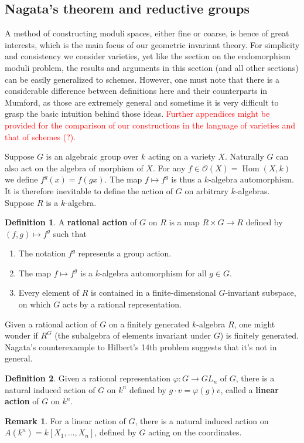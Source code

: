 \documentclass[12pt]{article}
\theoremstyle{remark}
\theoremstyle{definition}
\newtheorem{remark}{Remark}[section]
\newtheorem{definition}{Definition}[section]
\newcommand{\Hom}[0]{\operatorname{Hom}}
\begin{document}
    \subsection{Nagata's theorem and reductive groups}
    A method of constructing moduli spaces, either fine or coarse, is hence of great interests, which is the main focus of our geometric invariant theory. For simplicity and consistency we consider varieties, yet like the section on the endomorphism moduli problem, the results and arguments in this section (and all other sections) can be easily generalized to schemes. However, one must note that there is a considerable difference between definitions here and their counterparts in Mumford, as those are extremely general and sometime it is very difficult to grasp the basic intuition behind those ideas. \textcolor{red}{Further appendices might be provided for the comparison of our constructions in the language of varieties and that of schemes (?).}

    Suppose $G$ is an algebraic group over $k$ acting on a variety $X$. Naturally $G$ can also act on the algebra of morphism of $X$. For any $f\in \mathcal O(X)=\Hom(X, k)$ we define $f^g(x)=f(gx)$. The map $f\mapsto f^g$ is thus a $k$-algebra automorphism. It is therefore inevitable to define the action of $G$ on arbitrary $k$-algebras. Suppose $R$ is a $k$-algebra.
    \begin{definition}
        A \textbf{rational action} of $G$ on $R$ is a map $R\times G\to R$ defined by $(f, g)\mapsto f^g$ such that
        \begin{enumerate}[\normalfont(i)]
            \item The notation $f^g$ represents a group action.
            \item The map $f\mapsto f^g$ is a $k$-algebra automorphism for all $g\in G$.
            \item Every element of $R$ is contained in a finite-dimensional $G$-invariant subspace, on which $G$ acts by a rational representation.
        \end{enumerate}
    \end{definition}
    Given a rational action of $G$ on a finitely generated $k$-algebra $R$, one might wonder if $R^G$ (the subalgebra of elements invariant under $G$) is finitely generated. Nagata's counterexample to Hilbert's 14th problem suggests that it's not in general.
    \begin{definition}
        Given a rational representation $\varphi:G\to GL_n$ of $G$, there is a natural induced action of $G$ on $k^n$ defined by $g\cdot v=\varphi(g)v$, called a \textbf{linear action} of $G$ on $k^n$.
    \end{definition}
    \begin{remark}
        For a linear action of $G$, there is a natural induced action on $A(k^n)=k[X_1,\dots, X_n]$, defined by $G$ acting on the coordinates.
    \end{remark}
\end{document}
